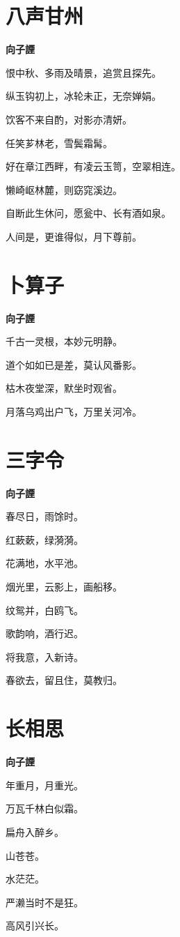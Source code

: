 \documentclass[12pt,a4paper]{ctexbook}
\begin{document}
\section{八声甘州}
\textbf{向子諲}\par\vspace{0.5em}
恨中秋、多雨及晴景，追赏且探先。\par
纵玉钩初上，冰轮未正，无奈婵娟。\par
饮客不来自酌，对影亦清妍。\par
任笑芗林老，雪鬓霜髯。\par
好在章江西畔，有凌云玉笥，空翠相连。\par
懒崎岖林麓，则窈窕溪边。\par
自断此生休问，愿瓮中、长有酒如泉。\par
人间是，更谁得似，月下尊前。\par

\section{卜算子}
\textbf{向子諲}\par\vspace{0.5em}
千古一灵根，本妙元明静。\par
道个如如已是差，莫认风番影。\par
枯木夜堂深，默坐时观省。\par
月落乌鸡出户飞，万里关河冷。\par

\section{三字令}
\textbf{向子諲}\par\vspace{0.5em}
春尽日，雨馀时。\par
红蔌蔌，绿漪漪。\par
花满地，水平池。\par
烟光里，云影上，画船移。\par
纹鸳并，白鸥飞。\par
歌韵响，酒行迟。\par
将我意，入新诗。\par
春欲去，留且住，莫教归。\par

\section{长相思}
\textbf{向子諲}\par\vspace{0.5em}
年重月，月重光。\par
万瓦千林白似霜。\par
扁舟入醉乡。\par
山苍苍。\par
水茫茫。\par
严濑当时不是狂。\par
高风引兴长。\par
\end{document}
